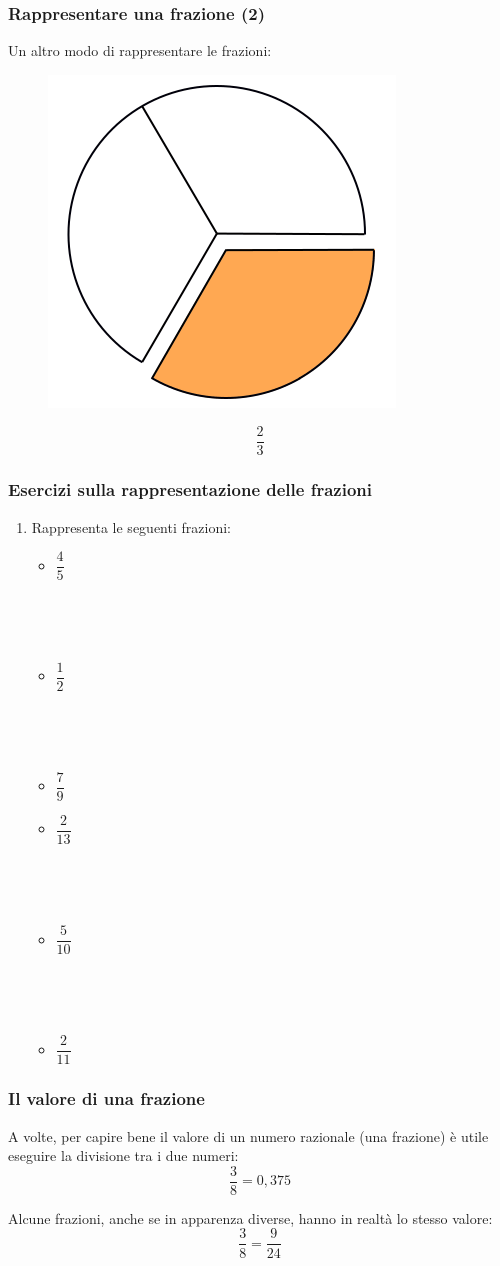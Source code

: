 \documentclass[]{beamer}
\theoremstyle{plain}
\begin{document}
\begin{frame}
\frametitle{Rappresentare una frazione (2)}
Un altro modo di rappresentare le frazioni:
\begin{figure}
  \includegraphics[width=.3\columnwidth]{img/fraz3.png}
\end{figure}
\[\frac{2}{3}\]
\end{frame}



\begin{frame}
\frametitle{Esercizi sulla rappresentazione delle frazioni}
\begin{enumerate}
  \item Rappresenta le seguenti frazioni:
  \begin{multicols}{2}
    \begin{itemize}
        \item $ \dfrac{4}{5} $
        
        ~

        ~
        \item $ \dfrac{1}{2} $
        
        ~

        ~
        \item $ \dfrac{7}{9} $
        \item $ \dfrac{2}{13} $
        
        ~

        ~
        \item $ \dfrac{5}{10} $
        
        ~

        ~
        \item $ \dfrac{2}{11} $
    \end{itemize}
  \end{multicols}
\end{enumerate}
\end{frame}





\begin{frame}
\frametitle{Il valore di una frazione}
A volte, per capire bene il valore di un numero razionale (una frazione) è utile \alert{eseguire la divisione tra i due numeri}:
\[\frac{3}{8}=0,375\]\pause

Alcune frazioni, anche se in apparenza diverse, hanno in realtà \alert{lo stesso valore}:
\[\frac{3}{8}=\frac{9}{24}\]
\end{frame}
\end{document}
